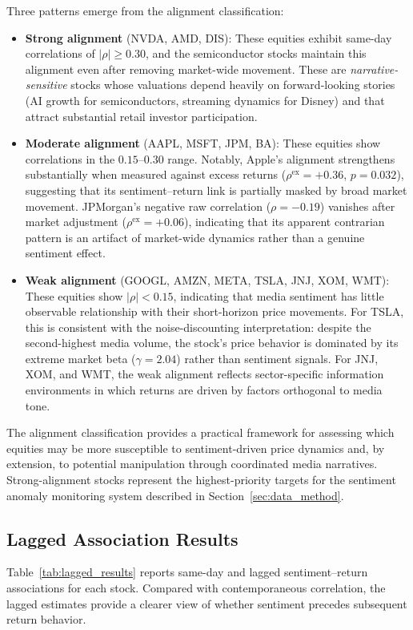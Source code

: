 \documentclass[lettersize,journal]{IEEEtran}
\begin{document}
Three patterns emerge from the alignment classification:

\begin{itemize}
    \item \textbf{Strong alignment} (NVDA, AMD, DIS): These equities exhibit same-day correlations of $|\rho| \geq 0.30$, and the semiconductor stocks maintain this alignment even after removing market-wide movement. These are \textit{narrative-sensitive} stocks whose valuations depend heavily on forward-looking stories (AI growth for semiconductors, streaming dynamics for Disney) and that attract substantial retail investor participation.

    \item \textbf{Moderate alignment} (AAPL, MSFT, JPM, BA): These equities show correlations in the $0.15$--$0.30$ range. Notably, Apple's alignment strengthens substantially when measured against excess returns ($\rho^{\mathrm{ex}} = +0.36$, $p = 0.032$), suggesting that its sentiment--return link is partially masked by broad market movement. JPMorgan's negative raw correlation ($\rho = -0.19$) vanishes after market adjustment ($\rho^{\mathrm{ex}} = +0.06$), indicating that its apparent contrarian pattern is an artifact of market-wide dynamics rather than a genuine sentiment effect.

    \item \textbf{Weak alignment} (GOOGL, AMZN, META, TSLA, JNJ, XOM, WMT): These equities show $|\rho| < 0.15$, indicating that media sentiment has little observable relationship with their short-horizon price movements. For TSLA, this is consistent with the noise-discounting interpretation: despite the second-highest media volume, the stock's price behavior is dominated by its extreme market beta ($\gamma = 2.04$) rather than sentiment signals. For JNJ, XOM, and WMT, the weak alignment reflects sector-specific information environments in which returns are driven by factors orthogonal to media tone.
\end{itemize}

The alignment classification provides a practical framework for assessing which equities may be more susceptible to sentiment-driven price dynamics and, by extension, to potential manipulation through coordinated media narratives. Strong-alignment stocks represent the highest-priority targets for the sentiment anomaly monitoring system described in Section~\ref{sec:data_method}.

\subsection{Lagged Association Results}
Table~\ref{tab:lagged_results} reports same-day and lagged sentiment--return associations for each stock. Compared with contemporaneous correlation, the lagged estimates provide a clearer view of whether sentiment precedes subsequent return behavior.
\end{document}
